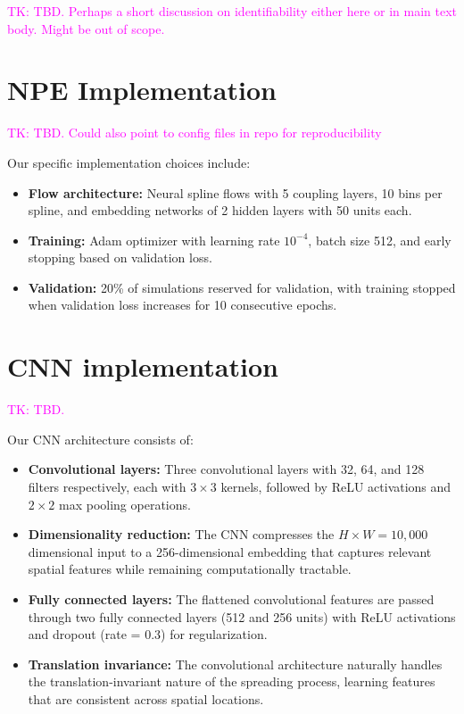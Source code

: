 \documentclass{article}
\begin{document}
\textcolor{magenta}{TK: TBD. Perhaps a short discussion on identifiability either here or in main text body. Might be out of scope.}

\section{NPE Implementation}\label{ap:npe_implementaion}

\textcolor{magenta}{TK: TBD. Could also point to config files in repo for reproducibility}

Our specific implementation choices include:
\begin{itemize}
	\item \textbf{Flow architecture:} Neural spline flows with 5 coupling layers, 10 bins per spline, and embedding networks of 2 hidden layers with 50 units each.
	\item \textbf{Training:} Adam optimizer with learning rate $10^{-4}$, batch size 512, and early stopping based on validation loss.
	\item \textbf{Validation:} 20\% of simulations reserved for validation, with training stopped when validation loss increases for 10 consecutive epochs.
\end{itemize}



\section{CNN implementation} \label{ap:cnn}

\textcolor{magenta}{TK: TBD.}



Our CNN architecture consists of:

\begin{itemize}
	\item \textbf{Convolutional layers:} Three convolutional layers with 32, 64, and 128 filters respectively, each with $3 \times 3$ kernels, followed by ReLU activations and $2 \times 2$ max pooling operations.
	
	\item \textbf{Dimensionality reduction:} The CNN compresses the $H \times W = 10,000$ dimensional input to a 256-dimensional embedding that captures relevant spatial features while remaining computationally tractable.
	
	\item \textbf{Fully connected layers:} The flattened convolutional features are passed through two fully connected layers (512 and 256 units) with ReLU activations and dropout (rate = 0.3) for regularization.
	
	\item \textbf{Translation invariance:} The convolutional architecture naturally handles the translation-invariant nature of the spreading process, learning features that are consistent across spatial locations.
\end{itemize}
\end{document}
